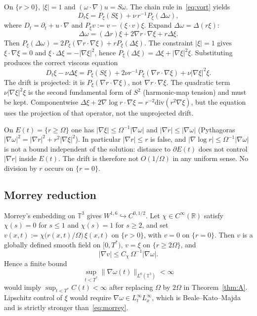 \documentclass[11pt,a4paper]{article}
\theoremstyle{definition}
\theoremstyle{remark}
\newcommand{\R}{\mathbb{R}}
\newcommand{\T}{\mathbb{T}}
\newcommand{\abs}[1]{\lvert#1\rvert}
\newcommand{\norm}[1]{\lVert#1\rVert}
\begin{document}
On \(\{r>0\}\), \(\abs{\xi}=1\) and \((\omega\cdot\nabla)u=S\omega\).
The chain rule in~\eqref{eq:vort} yields
\begin{equation}
\label{eq:xi-evol}
D_t\xi
=P_\xi(S\xi)
+\nu\, r^{-1}P_\xi(\Delta\omega),
\end{equation}
where \(D_t=\partial_t+u\cdot\nabla\) and
\(P_\xi v:=v-(\xi\cdot v)\xi\). Expand \(\Delta\omega=\Delta(r\xi)\):
\[
\Delta\omega=(\Delta r)\xi+2\nabla r\cdot\nabla\xi+r\Delta\xi.
\]
Then \(P_\xi(\Delta\omega)=2P_\xi(\nabla r\cdot\nabla\xi)+r P_\xi(\Delta\xi)\).
The constraint \(\abs{\xi}=1\) gives \(\xi\cdot\nabla\xi=0\) and
\(\xi\cdot\Delta\xi=-\abs{\nabla\xi}^2\), hence
\(P_\xi(\Delta\xi)=\Delta\xi+\abs{\nabla\xi}^2\xi\). Substituting produces
the correct viscous equation
\begin{equation}
\label{eq:xi-correct}
D_t\xi-\nu\Delta\xi
=P_\xi(S\xi)
+2\nu r^{-1}P_\xi(\nabla r\cdot\nabla\xi)
+\nu\abs{\nabla\xi}^2\xi.
\end{equation}
The drift is projected: it is \(P_\xi(\nabla r\cdot\nabla\xi)\), not
\(\nabla r\cdot\nabla\xi\). The quadratic term \(\nu\abs{\nabla\xi}^2\xi\)
is the second fundamental form of \(S^2\) (harmonic-map tension) and
must be kept. Componentwise
\(\Delta\xi+2\nabla\log r\cdot\nabla\xi=r^{-2}\mathrm{div}(r^2\nabla\xi)\),
but the equation uses the projection of that operator, not the unprojected
drift.

On \(E(t)=\{r\ge\Omega\}\) one has
\(\abs{\nabla\xi}\le\Omega^{-1}\abs{\nabla\omega}\) and
\(\abs{\nabla r}\le\abs{\nabla\omega}\) (Pythagoras
\(\abs{\nabla\omega}^2=\abs{\nabla r}^2+r^2\abs{\nabla\xi}^2\)).
In particular \(\abs{\nabla r}\le r\) is false, and
\(\abs{\nabla\log r}\le\Omega^{-1}\abs{\nabla\omega}\) is not a bound
independent of the solution: distance to \(\partial E(t)\) does not
control \(\abs{\nabla r}\) inside \(E(t)\). The drift is therefore
not \(O(1/\Omega)\) in any uniform sense. No division by \(r\) occurs
on \(\{r=0\}\).

\subsection{Morrey reduction}

Morrey's embedding on \(\T^3\) gives \(W^{1,6}\hookrightarrow C^{0,1/2}\).
Let \(\chi\in C^\infty(\R)\) satisfy \(\chi(s)=0\) for \(s\le 1\) and
\(\chi(s)=1\) for \(s\ge 2\), and set
\(v(x,t):=\chi\bigl(r(x,t)/\Omega\bigr)\,\xi(x,t)\) on \(\{r>0\}\),
with \(v=0\) on \(\{r=0\}\). Then \(v\) is a globally defined smooth
field on \([0,T^*)\), \(v=\xi\) on \(\{r\ge 2\Omega\}\), and
\begin{equation}
\label{eq:gradv}
\abs{\nabla v}\le C_\chi\,\Omega^{-1}\abs{\nabla\omega}.
\end{equation}
Hence a finite bound
\begin{equation}
\label{eq:morrey}
\sup_{t<T^*}\norm{\nabla\omega(t)}_{L^6(\T^3)}<\infty
\end{equation}
would imply \(\sup_{t<T^*}C(t)<\infty\) after replacing \(\Omega\) by
\(2\Omega\) in Theorem~\ref{thm:A}. Lipschitz control of \(\xi\) would
require \(\nabla\omega\in L^\infty_t L^\infty_x\), which is Beale--Kato--Majda
and is strictly stronger than~\eqref{eq:morrey}.
\end{document}
